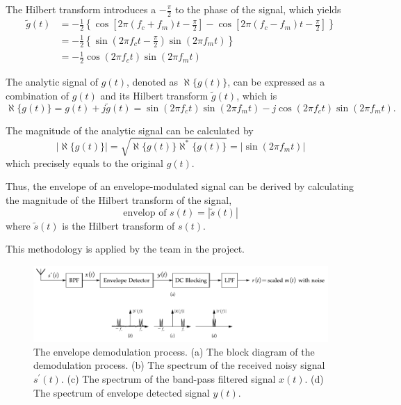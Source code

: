 \documentclass[../ECE459FinalProjectReport.tex]{subfiles}
\begin{document}
The Hilbert transform introduces a $-\frac{\pi}{2}$ to the phase of the signal, which yields
\begin{equation}
    \begin{aligned}
        \tilde{g}(t) & =-\frac{1}{2}\left\lbrace\cos\left[2\pi (f_c+f_m)t - \frac{\pi}{2}\right]-\cos\left[2\pi (f_c-f_m)t - \frac{\pi}{2}\right]\right\rbrace \\
                     & =-\frac{1}{2}\left\{ \sin\left( 2\pi f_ct-\frac{\pi}{2} \right) \sin\left( 2\pi f_mt \right) \right\}                                   \\
                     & =-\frac{1}{2}\cos\left( 2\pi f_ct \right) \sin\left( 2\pi f_mt \right)
    \end{aligned}
\end{equation}

The analytic signal of $g(t)$, denoted as $\aleph\{g(t)\}$, can be expressed as a combination of $g(t)$ and its Hilbert transform $\tilde{g}(t)$, which is
\begin{equation}
    \aleph\{g(t)\} = g(t) + j\tilde{g}(t) = \sin(2\pi f_c t)\sin(2\pi f_m t) - j\cos(2\pi f_c t)\sin(2\pi f_m t).
\end{equation}

The magnitude of the analytic signal can be calculated by
\begin{equation}
    \left| \aleph\{g(t)\}\right| = \sqrt{\aleph\{g(t)\}\aleph^*\{g(t)\}} = \left| \sin(2\pi f_m t)\right|
\end{equation}
which precisely equals to the original $g(t)$.

Thus, the envelope of an envelope-modulated signal can be derived by calculating the magnitude of the Hilbert transform of the signal,
\begin{equation}
    \text{envelop of $s(t)$} = \left| \tilde{s}(t) \right|
\end{equation}
where $\tilde{s}(t)$ is the Hilbert transform of $s(t)$.

This methodology is applied by the team in the project.

\begin{figure}[tb]
    \centering
    \includegraphics[width=\linewidth]{plots/env-demod.pdf}
    \caption{The envelope demodulation process. (a) The block diagram of the demodulation process. (b) The spectrum of the received noisy signal $s^\prime (t)$. (c) The spectrum of the band-pass filtered signal $x(t)$. (d) The spectrum of envelope detected signal $y(t)$.}
    \label{fig:env-demod}
\end{figure}
\end{document}
